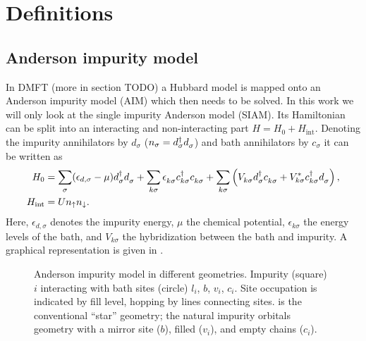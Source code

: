 
\chapter{Definitions}

\section{Anderson impurity model}

In DMFT (more in section TODO) a Hubbard model is mapped onto an Anderson impurity model (AIM)
which then needs to be solved.
In this work we will only look at the single impurity Anderson model (SIAM).
Its Hamiltonian can be split into an interacting and non-interacting part
$H = H_0 + H_\mathrm{int}$.
Denoting the impurity annihilators by $d_\sigma$ ($n_\sigma = d^\dag_\sigma d^{\pdag}_\sigma$)
and bath annihilators by $c_\sigma$
it can be written as
\begin{align}
    H_0
     & =
    \sum_{\pk\sigma} (\epsilon_{d,\sigma} - \mu) d^\dag_{\pk\sigma} d^{\pdag}_{\pk\sigma}
    +
    \sum_{k\sigma} \epsilon_{k\sigma}^{\pdag} c^\dag_{k\sigma} c^{\pdag}_{k\sigma}
    +
    \sum_{k\sigma} \left(V^{\ps}_{k\sigma} d^\dag_{\vphantom{k}\sigma} c^{\pdag}_{k\sigma}
    + V_{k\sigma}^* c^\dag_{k\sigma} d^{\pdag}_{\vphantom{k}\sigma} \right),
    \\
    H_\mathrm{int}
     & =
    U n_\uparrow n_\downarrow.
\end{align}
Here,
$\epsilon_{d,\sigma}$ denotes the impurity energy,
$\mu$ the chemical potential,
$\epsilon_{k\sigma}$ the energy levels of the bath,
and $V_{k\sigma}$ the hybridization between the bath and impurity.
A graphical representation is given in .

\begin{figure}[ht]
    \centering
    \savebox{\imagebox}{} %
    \begin{subfigure}{0.45\textwidth}
        \centering
        \usebox{\imagebox}
        \caption{}
        \label{subfig:geometry-star}
    \end{subfigure}
    \begin{subfigure}{0.45\textwidth}
        \centering
        \raisebox{\dimexpr0.5\ht\imagebox-0.5\height}
        {
            
        }
        \caption{}
        \label{subfig:geometry-natural-orbitals}
    \end{subfigure}
    \caption{
        Anderson impurity model in different geometries.
        Impurity (square) $i$ interacting with bath sites (circle) $l_i$, $b$, $v_i$, $c_i$.
        Site occupation is indicated by fill level, hopping by lines connecting sites.
         is the conventional ``star'' geometry;
         the natural impurity orbitals geometry
        with a mirror site ($b$), filled ($v_i$), and empty chains ($c_i$).
    }
\end{figure}


